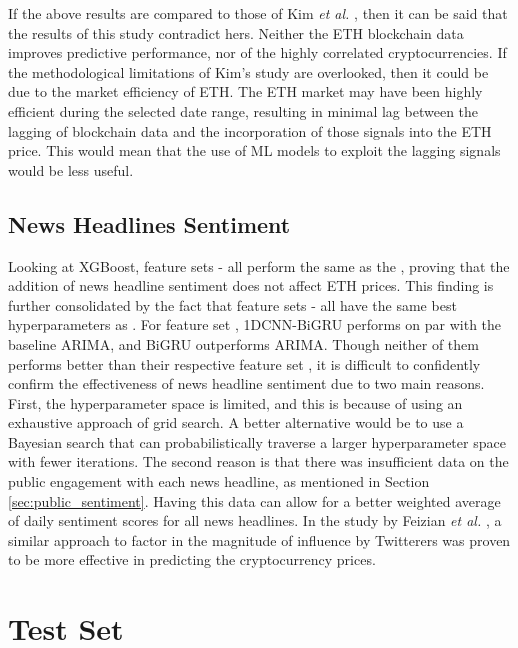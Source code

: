 \documentclass[ %
                    author={Raj Dhakan},
                supervisor={Dr. Ayush Joshi},
                    degree={MSc},
                     title={Ethereum Price Prediction using Internal and External Factors},
                  subtitle={},
                      type={},
                      year={2025}]{dissertation}
\begin{document}
If the above results are compared to those of Kim \textit{et al.} \cite{RN141}, then it can be said that the results of this study contradict hers. Neither the ETH blockchain data improves predictive performance, nor of the highly correlated cryptocurrencies. If the methodological limitations of Kim's study are overlooked, then it could be due to the market efficiency of ETH. The ETH market may have been highly efficient during the selected date range, resulting in minimal lag between the lagging of blockchain data and the incorporation of those signals into the ETH price. This would mean that the use of ML models to exploit the lagging signals would be less useful.

\subsection{News Headlines Sentiment}

Looking at XGBoost, feature sets - all perform the same as the , proving that the addition of news headline sentiment does not affect ETH prices. This finding is further consolidated by the fact that feature sets - all have the same best hyperparameters as . For feature set , 1DCNN-BiGRU performs on par with the baseline ARIMA, and BiGRU outperforms ARIMA. Though neither of them performs better than their respective feature set , it is difficult to confidently confirm the effectiveness of news headline sentiment due to two main reasons. First, the hyperparameter space is limited, and this is because of using an exhaustive approach of grid search. A better alternative would be to use a Bayesian search that can probabilistically traverse a larger hyperparameter space with fewer iterations. The second reason is that there was insufficient data on the public engagement with each news headline, as mentioned in Section \ref{sec:public_sentiment}. Having this data can allow for a better weighted average of daily sentiment scores for all news headlines. In the study by Feizian \textit{et al.} \cite{feizian2023cryptocurrency}, a similar approach to factor in the magnitude of influence by Twitterers was proven to be more effective in predicting the cryptocurrency prices. 

\section{Test Set}
\end{document}
